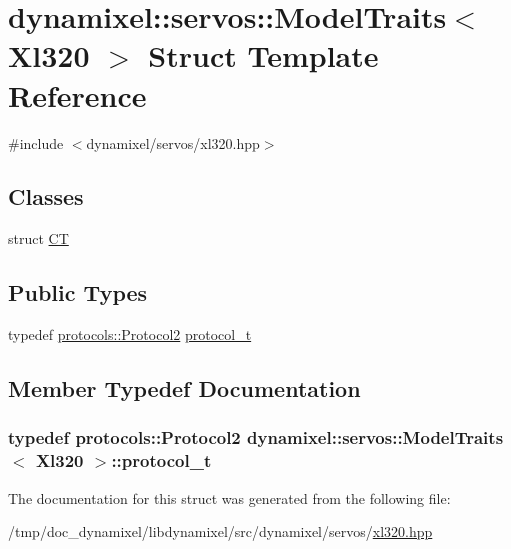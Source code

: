\hypertarget{structdynamixel_1_1servos_1_1_model_traits_3_01_xl320_01_4}{}\section{dynamixel\+:\+:servos\+:\+:Model\+Traits$<$ Xl320 $>$ Struct Template Reference}
\label{structdynamixel_1_1servos_1_1_model_traits_3_01_xl320_01_4}


{\ttfamily \#include $<$dynamixel/servos/xl320.\+hpp$>$}

\subsection*{Classes}
\begin{DoxyCompactItemize}
\item 
struct \hyperlink{structdynamixel_1_1servos_1_1_model_traits_3_01_xl320_01_4_1_1_c_t}{CT}
\end{DoxyCompactItemize}
\subsection*{Public Types}
\begin{DoxyCompactItemize}
\item 
typedef \hyperlink{classdynamixel_1_1protocols_1_1_protocol2}{protocols\+::\+Protocol2} \hyperlink{structdynamixel_1_1servos_1_1_model_traits_3_01_xl320_01_4_a8d37bd76bd43745044dff497269f4520}{protocol\+\_\+t}
\end{DoxyCompactItemize}


\subsection{Member Typedef Documentation}
\subsubsection[{\texorpdfstring{protocol\+\_\+t}{protocol_t}}]{\setlength{\rightskip}{0pt plus 5cm}typedef {\bf protocols\+::\+Protocol2} {\bf dynamixel\+::servos\+::\+Model\+Traits}$<$ {\bf Xl320} $>$\+::{\bf protocol\+\_\+t}}\hypertarget{structdynamixel_1_1servos_1_1_model_traits_3_01_xl320_01_4_a8d37bd76bd43745044dff497269f4520}{}\label{structdynamixel_1_1servos_1_1_model_traits_3_01_xl320_01_4_a8d37bd76bd43745044dff497269f4520}


The documentation for this struct was generated from the following file\+:\begin{DoxyCompactItemize}
\item 
/tmp/doc\+\_\+dynamixel/libdynamixel/src/dynamixel/servos/\hyperlink{xl320_8hpp}{xl320.\+hpp}\end{DoxyCompactItemize}
